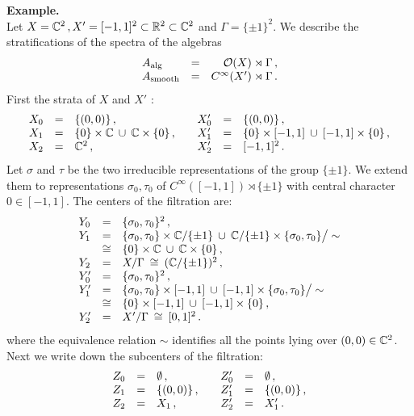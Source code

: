 \noindent\textbf{Example.}\\
Let $X = \mathbb C^2 \,, X' = [-1,1]^2 \subset \mathbb R^2 \subset \mathbb
C^2$ and $\Gamma = \{ \pm 1 \}^2$. We describe the stratifications
of the spectra of the algebras
\[
\begin{array}{lcr}
A_\mathrm{alg} & = & \mathcal O (X) \rtimes \Gamma \,, \\
A_\mathrm{smooth} & = & C^\infty (X') \rtimes \Gamma \,.
\end{array}
\]
First the strata of $X$ and $X'$ :
\[
\begin{array}{lll@{\qquad}lll}
X_0 & = & \{ (0,0) \} \,, & X'_0 & = & \{ (0,0) \} \,,\\
X_1 & = & \{ 0 \} \times \mh C \: \cup \: \mh C \times \{ 0 \} \,, &
X'_1 & = & \{ 0 \} \times [-1,1] \: \cup \: [-1,1] \times \{ 0 \} \,, \\
X_2 & = & \mh C^2 \,, & X'_2 & = & [-1,1]^2 \,.
\end{array}
\]
Let $\sigma$ and $\tau$ be the two irreducible representations of the
group $\{ \pm 1 \}$. We extend them to representations $\sigma_0 , \tau_0$
of $C^\infty ([-1,1]) \rtimes \{ \pm 1 \}$ with central character $0 \in [-1,1]$.
The centers of the filtration are:
\[
\begin{array}{lll}
Y_0 & = & \{ \sigma_0 ,\tau_0 \}^2 \,, \\
Y_1 & = & \{ \sigma_0 ,\tau_0 \} \times \mathbb C / \{ \pm 1 \} \: \cup \:
\mathbb C / \{ \pm 1 \} \times \{ \sigma_0 ,\tau_0 \} \big/ \sim \\
& \cong & \{ 0 \} \times \mathbb C \: \cup \: \mathbb C \times \{ 0 \} \,, \\
Y_2 & = & X / \Gamma \: \cong \: ( \mathbb C / \{ \pm 1 \} )^2 \,, \\
Y'_0 & = & \{ \sigma_0 ,\tau_0 \}^2 \,, \\
Y'_1 & = & \{ \sigma_0 ,\tau_0 \} \times [-1,1] \: \cup \:
[-1,1] \times \{ \sigma_0 ,\tau_0 \} \big/ \sim \\
& \cong & \{ 0 \} \times [-1,1] \: \cup \: [-1,1] \times \{ 0 \} \,, \\
Y'_2 & = & X' / \Gamma \: \cong \: [0,1]^2 \,.
\end{array}
\]
where the equivalence relation $\sim$ identifies all the points lying over $(0,0) \in \mathbb C^2$.
Next we write down the subcenters of the filtration:
\[
\begin{array}{lll@{\qquad}lll}
Z_0 & = & \es \,, & Z'_0 & = & \es \,,\\
Z_1 & = & \{ (0,0) \} \,, & Z'_1 & = & \{ (0,0) \} \,, \\
Z_2 & = & X_1 \,, & Z'_2 & = & X'_1 \,.
\end{array}
\]
